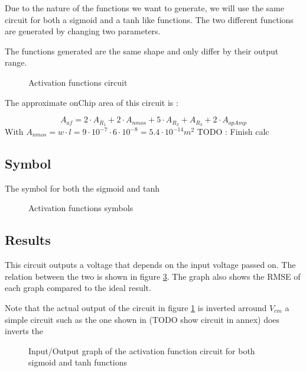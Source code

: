 Due to the nature of the functions we want to generate, we will use the same circuit for both a sigmoid and a \ac{tanh} like functions. The two different functions are generated by changing two parameters.

The functions generated are the same shape and only differ by their output range.

\begin{figure}[H]
  \centering
  
  \caption{Activation functions circuit}
  \label{fig:afCircuit}
\end{figure}

The approximate onChip area of this circuit is :

\begin{equation}
  A_{af}=2\cdot A_{R_1} + 2\cdot A_{nmos} + 5\cdot A_{R_2} + A_{R_3} +2\cdot A_{opAmp}
\end{equation}
With $A_{nmos} = w\cdot l = 9\cdot 10^{-7} \cdot 6 \cdot 10^{-8} = 5.4 \cdot 10^{-14} m^2$
TODO : Finish calc



\subsection{Symbol}
The symbol for both the sigmoid and \ac{tanh}

\begin{figure}[H]
  \centering
  \hspace*{1.5cm}
  \hfill
  \hspace*{1.5cm}
  \caption{Activation functions symbols}
  \label{fig:afSymbol}
\end{figure}

\subsection{Results}

This circuit outputs a voltage that depends on the input voltage passed on. The relation between the two is shown in figure \ref{fig:afGraph}. The graph also shows the \ac{RMSE} of each graph compared to the ideal result.

Note that the actual output of the circuit in figure \ref{fig:afCircuit} is inverted arround $V_{cm}$ a simple circuit such as the one shown in  (TODO show circuit in annex) does inverts the

\begin{figure}[H]
  \centering
  
  \caption{Input/Output graph of the activation function circuit for both sigmoid and \ac{tanh} functions}
  \label{fig:afGraph}
\end{figure}
